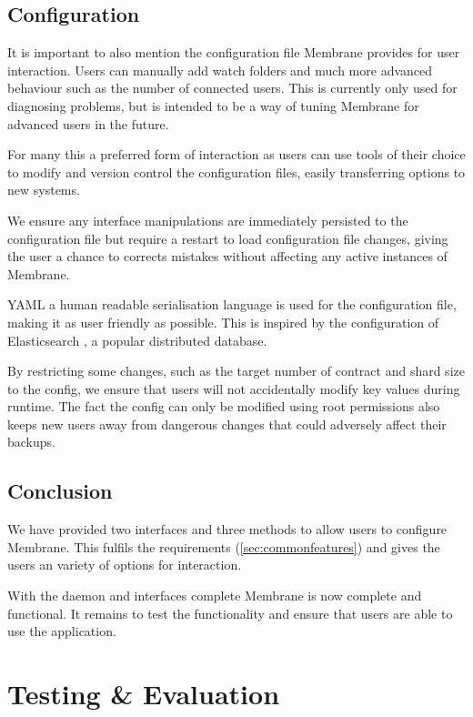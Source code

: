 \documentclass[11pt, a4paper, twoside]{report}
\begin{document}
\section{Configuration}

It is important to also mention the configuration file Membrane provides for user interaction. Users can manually add watch folders and much more advanced behaviour such as the number of connected users. This is currently only used for diagnosing problems, but is intended to be a way of tuning Membrane for advanced users in the future.

For many this a preferred form of interaction as users can use tools of their choice to modify and version control the configuration files, easily transferring options to new systems.

We ensure any interface manipulations are immediately persisted to the configuration file but require a restart to load configuration file changes, giving the user a chance to corrects mistakes without affecting any active instances of Membrane.

YAML a human readable serialisation language \citep{evans2009yaml} is used for the configuration file, making it as user friendly as possible. This is inspired by the configuration of Elasticsearch \citep{elastic2017config}, a popular distributed database.

By restricting some changes, such as the target number of contract and shard size to the config, we ensure that users will not accidentally modify key values during runtime. The fact the config can only be modified using root permissions also keeps new users away from dangerous changes that could adversely affect their backups.

\section{Conclusion}

We have provided two interfaces and three methods to allow users to configure Membrane. This fulfils the requirements (\ref{sec:commonfeatures}) and gives the users an variety of options for interaction.

With the daemon and interfaces complete Membrane is now complete and functional. It remains to test the functionality and ensure that users are able to use the application.

\chapter{Testing \& Evaluation}
\end{document}
